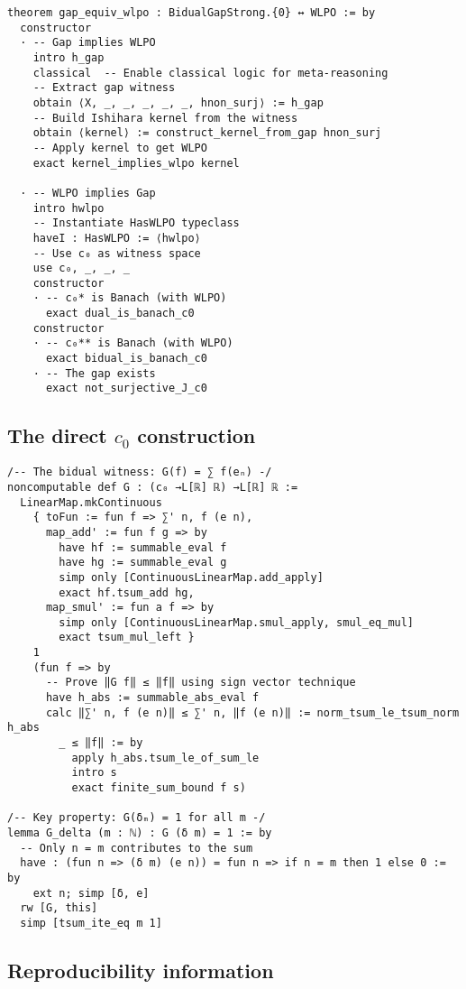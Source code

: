 \documentclass[11pt]{article}  %
\begin{document}
\begin{lstlisting}[caption={Complete bidirectional proof in Lean}]
theorem gap_equiv_wlpo : BidualGapStrong.{0} ↔ WLPO := by
  constructor
  · -- Gap implies WLPO
    intro h_gap
    classical  -- Enable classical logic for meta-reasoning
    -- Extract gap witness
    obtain ⟨X, _, _, _, _, _, hnon_surj⟩ := h_gap
    -- Build Ishihara kernel from the witness
    obtain ⟨kernel⟩ := construct_kernel_from_gap hnon_surj
    -- Apply kernel to get WLPO
    exact kernel_implies_wlpo kernel
    
  · -- WLPO implies Gap
    intro hwlpo
    -- Instantiate HasWLPO typeclass
    haveI : HasWLPO := ⟨hwlpo⟩
    -- Use c₀ as witness space
    use c₀, _, _, _
    constructor
    · -- c₀* is Banach (with WLPO)
      exact dual_is_banach_c0
    constructor  
    · -- c₀** is Banach (with WLPO)
      exact bidual_is_banach_c0
    · -- The gap exists
      exact not_surjective_J_c0
\end{lstlisting}

\subsection{The direct $c_0$ construction}

\begin{lstlisting}[caption={Bidual functional $G$ for $c_0$}]
/-- The bidual witness: G(f) = ∑ f(eₙ) -/
noncomputable def G : (c₀ →L[ℝ] ℝ) →L[ℝ] ℝ :=
  LinearMap.mkContinuous
    { toFun := fun f => ∑' n, f (e n),
      map_add' := fun f g => by
        have hf := summable_eval f
        have hg := summable_eval g
        simp only [ContinuousLinearMap.add_apply]
        exact hf.tsum_add hg,
      map_smul' := fun a f => by
        simp only [ContinuousLinearMap.smul_apply, smul_eq_mul]
        exact tsum_mul_left }
    1
    (fun f => by
      -- Prove ‖G f‖ ≤ ‖f‖ using sign vector technique
      have h_abs := summable_abs_eval f  
      calc ‖∑' n, f (e n)‖ ≤ ∑' n, ‖f (e n)‖ := norm_tsum_le_tsum_norm h_abs
        _ ≤ ‖f‖ := by
          apply h_abs.tsum_le_of_sum_le
          intro s
          exact finite_sum_bound f s)

/-- Key property: G(δₘ) = 1 for all m -/
lemma G_delta (m : ℕ) : G (δ m) = 1 := by
  -- Only n = m contributes to the sum
  have : (fun n => (δ m) (e n)) = fun n => if n = m then 1 else 0 := by
    ext n; simp [δ, e]
  rw [G, this]
  simp [tsum_ite_eq m 1]
\end{lstlisting}

\subsection{Reproducibility information}
\end{document}
